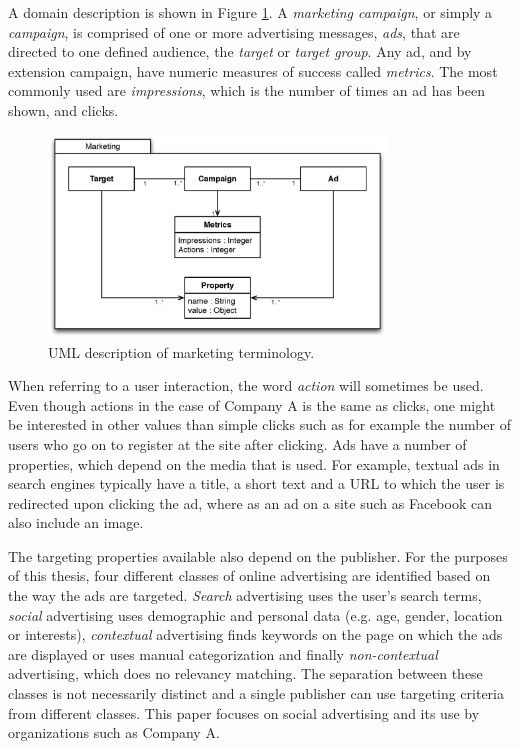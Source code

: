 \documentclass{sig-alternate}
\begin{document}
A domain description is shown in Figure \ref{fig:MarketingTerminology}. A \emph{marketing campaign}, or simply a \emph{campaign}, is comprised of one or more advertising messages, \emph{ads}, that are directed to one defined audience, the \emph{target} or \emph{target group}. Any ad, and by extension campaign, have numeric measures of success called \emph{metrics}. The most commonly used are \emph{impressions}, which is the number of times an ad has been shown, and clicks.

\begin{figure}[htb] \centering \includegraphics[width=0.8\textwidth]{marketing-uml.eps}
	\caption{UML description of marketing terminology.}
	\label{fig:MarketingTerminology}
\end{figure}

When referring to a user interaction, the word \emph{action} will sometimes be used. Even though actions in the case of Company A is the same as clicks, one might be interested in other values than simple clicks such as for example the number of users who go on to register at the site after clicking. Ads have a number of properties, which depend on the media that is used. For example, textual ads in search engines typically have a title, a short text and a URL to which the user is redirected upon clicking the ad, where as an ad on a site such as Facebook can also include an image.

The targeting properties available also depend on the publisher. For the purposes of this thesis, four different classes of online advertising are identified based on the way the ads are targeted. \emph{Search} advertising uses the user's search terms, \emph{social} advertising uses demographic and personal data (e.g. age, gender, location or interests), \emph{contextual} advertising finds keywords on the page on which the ads are displayed or uses manual categorization and finally \emph{non-contextual} advertising, which does no relevancy matching. The separation between these classes is not necessarily distinct and a single publisher can use targeting criteria from different classes. This paper focuses on social advertising and its use by organizations such as Company A.
\end{document}
